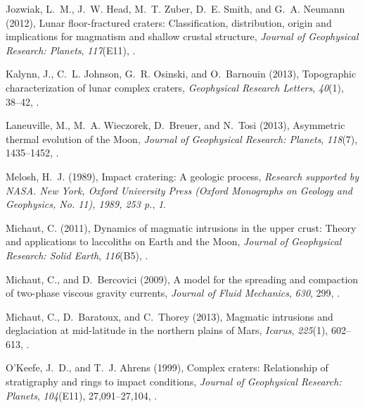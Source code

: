 \begin{article}
\begin{enumerate}
\begin{thebibliography}{39}
Jozwiak, L.~M., J.~W. Head, M.~T. Zuber, D.~E. Smith, and G.~A. Neumann (2012),
  {Lunar floor-fractured craters: Classification, distribution, origin and
  implications for magmatism and shallow crustal structure}, \textit{Journal of
  Geophysical Research: Planets}, \textit{117}(E11),
  .

Kalynn, J., C.~L. Johnson, G.~R. Osinski, and O.~Barnouin (2013), {Topographic
  characterization of lunar complex craters}, \textit{Geophysical Research
  Letters}, \textit{40}(1), 38--42, .

Laneuville, M., M.~A. Wieczorek, D.~Breuer, and N.~Tosi (2013), {Asymmetric
  thermal evolution of the Moon}, \textit{Journal of Geophysical Research:
  Planets}, \textit{118}(7), 1435--1452, .

Melosh, H.~J. (1989), {Impact cratering: A geologic process}, \textit{Research
  supported by NASA. New York, Oxford University Press (Oxford Monographs on
  Geology and Geophysics, No. 11), 1989, 253 p.}, \textit{1}.

Michaut, C. (2011), {Dynamics of magmatic intrusions in the upper crust: Theory
  and applications to laccoliths on Earth and the Moon}, \textit{Journal of
  Geophysical Research: Solid Earth}, \textit{116}(B5),
  .

Michaut, C., and D.~Bercovici (2009), {A model for the spreading and compaction
  of two-phase viscous gravity currents}, \textit{Journal of Fluid Mechanics},
  \textit{630}, 299, .

Michaut, C., D.~Baratoux, and C.~Thorey (2013), {Magmatic intrusions and
  deglaciation at mid-latitude in the northern plains of Mars},
  \textit{Icarus}, \textit{225}(1), 602--613,
  .

O'Keefe, J.~D., and T.~J. Ahrens (1999), {Complex craters: Relationship of
  stratigraphy and rings to impact conditions}, \textit{Journal of Geophysical
  Research: Planets}, \textit{104}(E11), 27,091--27,104,
  .


\end{thebibliography}
\end{enumerate}
\end{article}
